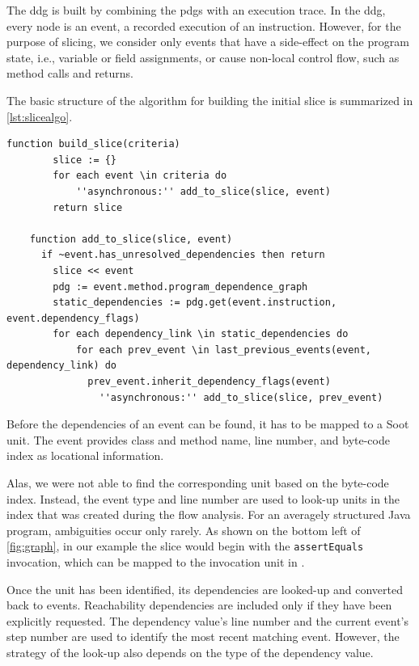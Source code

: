 The \ac{ddg} is built by combining the \acp{pdg} with an execution trace.
In the \ac{ddg}, every node is an event, a recorded execution of an instruction.
However, for the purpose of slicing, we consider only events that have a side-effect on the program state, i.e., variable or field assignments, or cause non-local control flow, such as method calls and returns.


The basic structure of the algorithm for building the initial slice is summarized in \cref{lst:slicealgo}.

\begin{lstlisting}[float=t,language=algorithm,label=lst:slicealgo,caption={Simplified algorithm for building the slice}]
	function build_slice(criteria)
		slice := {}
		for each event \in criteria do
			''asynchronous:'' add_to_slice(slice, event)
		return slice
		
	function add_to_slice(slice, event)
	  if ~event.has_unresolved_dependencies then return
		slice << event
		pdg := event.method.program_dependence_graph
		static_dependencies := pdg.get(event.instruction, event.dependency_flags)
		for each dependency_link \in static_dependencies do
			for each prev_event \in last_previous_events(event, dependency_link) do
			  prev_event.inherit_dependency_flags(event)
				''asynchronous:'' add_to_slice(slice, prev_event)
\end{lstlisting}


Before the dependencies of an event can be found, it has to be mapped to a Soot unit.
The event provides class and method name, line number, and byte-code index as locational information.

Alas, we were not able to find the corresponding unit based on the byte-code index.
Instead, the event type and line number are used to look-up units in the index that was created during the flow analysis.
For an averagely structured Java program, ambiguities occur only rarely.
As shown on the bottom left of \autoref{fig:graph}, in our example the slice would begin with the \verb+assertEquals+ invocation, which can be mapped to the invocation unit in .

Once the unit has been identified, its dependencies are looked-up and converted back to events.
Reachability dependencies are included only if they have been explicitly requested.
The dependency value's line number and the current event's step number are used to identify the most recent matching event.
However, the strategy of the look-up also depends on the type of the dependency value.

